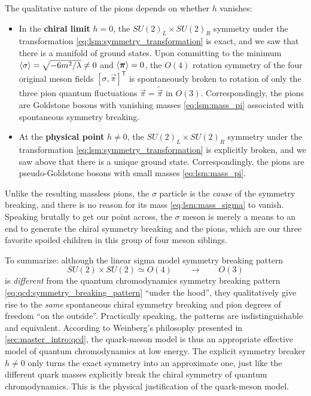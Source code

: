 The qualitative nature of the pions depends on whether $h$ vanishes:
\begin{itemize}
\item In the \textbf{chiral limit} $h = 0$,
      the $SU(2)_L \times SU(2)_R$ symmetry under the transformation \eqref{eq:lsm:symmetry_transformation} is exact,
      and we saw that there is a manifold of ground states.
      Upon committing to the minimum $\langle \sigma \rangle = \sqrt{-6m^2/\lambda} \neq 0$ and $\langle {\bm{\pi}} \rangle = 0$,
      the $O(4)$ rotation symmetry of the four original meson fields $[\sigma,\vec\pi]^\mathsf{T}$ is spontaneously broken
      to rotation of only the three pion quantum fluctuations $\vec{\pi} = \tilde{\vec\pi}$ in $O(3)$.
      Correspondingly, the pions are Goldstone bosons with vanishing masses \eqref{eq:lsm:mass_pi} associated with spontaneous symmetry breaking.
\item At the \textbf{physical point} $h \neq 0$,
      the $SU(2)_L \times SU(2)_R$ symmetry under the transformation \eqref{eq:lsm:symmetry_transformation} is explicitly broken,
      and we saw above that there is a unique ground state.
      Correspondingly, the pions are pseudo-Goldstone bosons with small masses \eqref{eq:lsm:mass_pi}.
\end{itemize}
\label{elaborate on mexican hat analogy, brim, tip/tilt, etc.}
Unlike the resulting massless pions, the $\sigma$ particle is the \emph{cause} of the symmetry breaking,
and there is no reason for its mass \eqref{eq:lsm:mass_sigma} to vanish.
Speaking brutally to get our point across, the $\sigma$ meson is merely a means to an end
to generate the chiral symmetry breaking and the pions,
which are our three favorite spoiled children in this group of four meson siblings.

To summarize: although the linear sigma model symmetry breaking pattern
\begin{equation}
	SU(2) \times SU(2) \simeq O(4) \qquad \longrightarrow \qquad O(3)
\end{equation}
is \emph{different} from the quantum chromodynamics symmetry breaking pattern \eqref{eq:qcd:symmetry_breaking_pattern} ``under the hood'',
they qualitatively give rise to the \emph{same} spontaneous chiral symmetry breaking and pion degrees of freedom ``on the outside''.
Practically speaking, the patterns are indistinguishable and equivalent.
According to Weinberg's philosophy presented in \cref{sec:master_intro:qcd},
the quark-meson model is thus an appropriate effective model of quantum chromodynamics at low energy.
The explicit symmetry breaker $h \neq 0$ only turns the exact symmetry into an approximate one,
just like the different quark masses explicitly break the chiral symmetry of quantum chromodynamics.
This is the physical justification of the quark-meson model.

